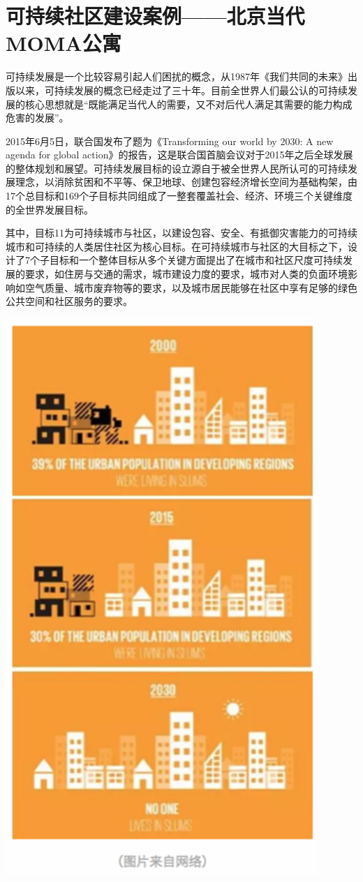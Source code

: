 \documentclass[]{book}
\begin{document}
\section{可持续社区建设案例------北京当代MOMA公寓}\label{moma}

可持续发展是一个比较容易引起人们困扰的概念，从1987年《我们共同的未来》出版以来，可持续发展的概念已经走过了三十年。目前全世界人们最公认的可持续发展的核心思想就是``既能满足当代人的需要，又不对后代人满足其需要的能力构成危害的发展''。

2015年6月5日，联合国发布了题为《Transforming our world by 2030: A new
agenda for global
action》的报告，这是联合国首脑会议对于2015年之后全球发展的整体规划和展望。可持续发展目标的设立源自于被全世界人民所认可的可持续发展理念，以消除贫困和不平等、保卫地球、创建包容经济增长空间为基础构架，由17个总目标和169个子目标共同组成了一整套覆盖社会、经济、环境三个关键维度的全世界发展目标。

其中，目标11为可持续城市与社区，以建设包容、安全、有抵御灾害能力的可持续城市和可持续的人类居住社区为核心目标。在可持续城市与社区的大目标之下，设计了7个子目标和一个整体目标从多个关键方面提出了在城市和社区尺度可持续发展的要求，如住房与交通的需求，城市建设力度的要求，城市对人类的负面环境影响如空气质量、城市废弃物等的要求，以及城市居民能够在社区中享有足够的绿色公共空间和社区服务的要求。

\includegraphics[width=4.67in]{images/moma1}
\end{document}

